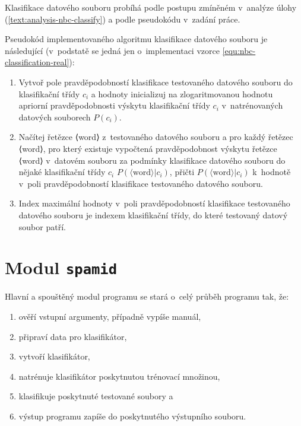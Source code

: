 \documentclass[a4paper, 12pt]{report}
\begin{document}
Klasifikace datového souboru probíhá podle postupu zmíněném v~analýze 
úlohy (\ref{text:analysis-nbc-classify}) a podle pseudokódu v~zadání 
práce.

Pseudokód implementovaného algoritmu klasifikace datového souboru je 
následující (v~podstatě se jedná jen o~implementaci vzorce 
\ref{equ:nbc-classification-real}):

\begin{enumerate}
    \item Vytvoř pole pravděpodobností klasifikace testovaného datového 
souboru do klasifikační třídy $c_i$ a hodnoty inicializuj na 
zlogaritmovanou hodnotu apriorní pravděpodobnosti výskytu klasifikační 
třídy $c_i$ v~natrénovaných datových souborech $P(c_i)$.

    \item Načítej řetězce ⟨word⟩ z~testovaného datového souboru a pro 
každý řetězec ⟨word⟩, pro který existuje vypočtená pravděpodobnost výskytu 
řetězce ⟨word⟩ v~datovém souboru za podmínky klasifikace datového souboru 
do nějaké klasifikační třídy $c_i$ $P(\langle \text{word} \rangle|c_i)$, 
přičti $P(\langle \text{word} \rangle|c_i)$ k~hodnotě v~poli 
pravděpodobností klasifikace testovaného datového souboru.

    \item Index maximální hodnoty v~poli pravděpodobností klasifikace 
testovaného datového souboru je indexem klasifikační třídy, do které 
testovaný datový soubor patří.
\end{enumerate}

\section{Modul \texttt{spamid}}

Hlavní a spouštěný modul programu se stará o~celý průběh programu tak, že:

\begin{enumerate}
    \item ověří vstupní argumenty, případně vypíše manuál,
    \item připraví data pro klasifikátor,
    \item vytvoří klasifikátor,
    \item natrénuje klasifikátor poskytnutou trénovací množinou,
    \item klasifikuje poskytnuté testované soubory a
    \item výstup programu zapíše do poskytnutého výstupního souboru.
\end{enumerate}
\end{document}
